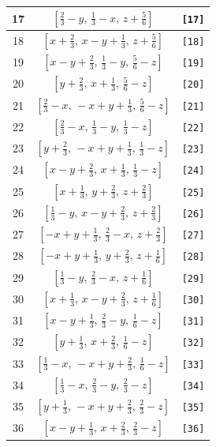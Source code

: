 \documentclass[fleqn,8pt]{jsarticle}
\begin{document}
\begin{longtable}{ccc}
17 & $\left[ \frac{2}{3} - y,\, \frac{1}{3} - x,\, z + \frac{5}{6} \right]$ & {\tt [17]} \\ \hline
18 & $\left[ x + \frac{2}{3},\, x - y + \frac{1}{3},\, z + \frac{5}{6} \right]$ & {\tt [18]} \\ \hline
19 & $\left[ x - y + \frac{2}{3},\, \frac{1}{3} - y,\, \frac{5}{6} - z \right]$ & {\tt [19]} \\ \hline
20 & $\left[ y + \frac{2}{3},\, x + \frac{1}{3},\, \frac{5}{6} - z \right]$ & {\tt [20]} \\ \hline
21 & $\left[ \frac{2}{3} - x,\, - x + y + \frac{1}{3},\, \frac{5}{6} - z \right]$ & {\tt [21]} \\ \hline
22 & $\left[ \frac{2}{3} - x,\, \frac{1}{3} - y,\, \frac{1}{3} - z \right]$ & {\tt [22]} \\ \hline
23 & $\left[ y + \frac{2}{3},\, - x + y + \frac{1}{3},\, \frac{1}{3} - z \right]$ & {\tt [23]} \\ \hline
24 & $\left[ x - y + \frac{2}{3},\, x + \frac{1}{3},\, \frac{1}{3} - z \right]$ & {\tt [24]} \\ \hline
25 & $\left[ x + \frac{1}{3},\, y + \frac{2}{3},\, z + \frac{2}{3} \right]$ & {\tt [25]} \\ \hline
26 & $\left[ \frac{1}{3} - y,\, x - y + \frac{2}{3},\, z + \frac{2}{3} \right]$ & {\tt [26]} \\ \hline
27 & $\left[ - x + y + \frac{1}{3},\, \frac{2}{3} - x,\, z + \frac{2}{3} \right]$ & {\tt [27]} \\ \hline
28 & $\left[ - x + y + \frac{1}{3},\, y + \frac{2}{3},\, z + \frac{1}{6} \right]$ & {\tt [28]} \\ \hline
29 & $\left[ \frac{1}{3} - y,\, \frac{2}{3} - x,\, z + \frac{1}{6} \right]$ & {\tt [29]} \\ \hline
30 & $\left[ x + \frac{1}{3},\, x - y + \frac{2}{3},\, z + \frac{1}{6} \right]$ & {\tt [30]} \\ \hline
31 & $\left[ x - y + \frac{1}{3},\, \frac{2}{3} - y,\, \frac{1}{6} - z \right]$ & {\tt [31]} \\ \hline
32 & $\left[ y + \frac{1}{3},\, x + \frac{2}{3},\, \frac{1}{6} - z \right]$ & {\tt [32]} \\ \hline
33 & $\left[ \frac{1}{3} - x,\, - x + y + \frac{2}{3},\, \frac{1}{6} - z \right]$ & {\tt [33]} \\ \hline
34 & $\left[ \frac{1}{3} - x,\, \frac{2}{3} - y,\, \frac{2}{3} - z \right]$ & {\tt [34]} \\ \hline
35 & $\left[ y + \frac{1}{3},\, - x + y + \frac{2}{3},\, \frac{2}{3} - z \right]$ & {\tt [35]} \\ \hline
36 & $\left[ x - y + \frac{1}{3},\, x + \frac{2}{3},\, \frac{2}{3} - z \right]$ & {\tt [36]} \\
\end{longtable}
\end{document}

